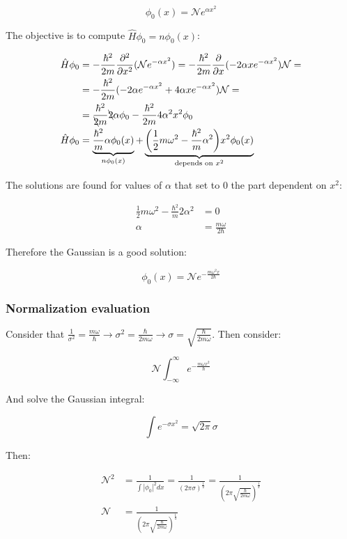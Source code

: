  $$\phi_0(x) = \mathcal{N} e^{\alpha x^2}$$

  The objective is to compute $\hat{H}\phi_0 = n\phi_0(x)$:

  \begin{align*}
    \hat{H}\phi_0 &= -\frac{\hbar^2}{2m}\frac{\partial^2}{\partial x^2}(\mathcal{N}e^{-\alpha x^2}) = -\frac{\hbar^2}{2m}\frac{\partial}{\partial x}(-2\alpha x e^{-\alpha x^2})\mathcal{N}=\\
                  &=-\frac{\hbar^2}{2m}(-2\alpha e^{-\alpha x^2}+4\alpha xe^{-\alpha x^2})\mathcal{N}=\\
                  &= \frac{\hbar^2}{\bcancel{2}m}\bcancel{2}\alpha\phi_0 -\frac{\hbar^2}{2m}4\alpha^2 x^2\phi_0\\
    \hat{H}\phi_0 &= \underbrace{\frac{\hbar^2}{m}\alpha\phi_0(x)}_{n\phi_0(x)} + \underbrace{\biggl(\frac{1}{2}m\omega^2-\frac{\hbar^2}{m}\alpha^2\biggr)x^2\phi_0(x)}_{\text{depends on }x^2}
  \end{align*}

  The solutions are found for values of $\alpha$ that set to $0$ the part dependent on $x^2$:

  \begin{align*}
    \frac{1}{2}m\omega^2 -\frac{\hbar^2}{m}2\alpha^2 &= 0\\
    \alpha &= \frac{m\omega}{2\hbar}
  \end{align*}

  Therefore the Gaussian is a good solution:

  $$\phi_0(x) = \mathcal{N}e^{-\frac{m\omega^2x}{2\hbar}}$$

    \subsubsection{Normalization evaluation}
    Consider that $\frac{1}{\sigma^2} = \frac{m\omega}{\hbar} \rightarrow \sigma^2 = \frac{\hbar}{2m\omega}\rightarrow \sigma = \sqrt{\frac{\hbar}{2m\omega}}$.
    Then consider:

    $$\mathcal{N}\int_{-\infty}^\infty e^{-\frac{m\omega x^2}{\hbar}}$$

    And solve the Gaussian integral:

    $$\int e^{-\sigma x^2} = \sqrt{2\pi}\sigma$$

    Then:

    \begin{align*}
      \mathcal{N}^2 &= \frac{1}{\int|\phi_0|^2dx} = \frac{1}{(2\pi\sigma)^{\frac{1}{2}}} = \frac{1}{(2\pi\sqrt{\frac{\hbar}{2m\omega}})^\frac{1}{2}}\\
      \mathcal{N} &= \frac{1}{(2\pi\sqrt{\frac{\hbar}{2m\omega}})^{\frac{1}{4}}}
    \end{align*}

